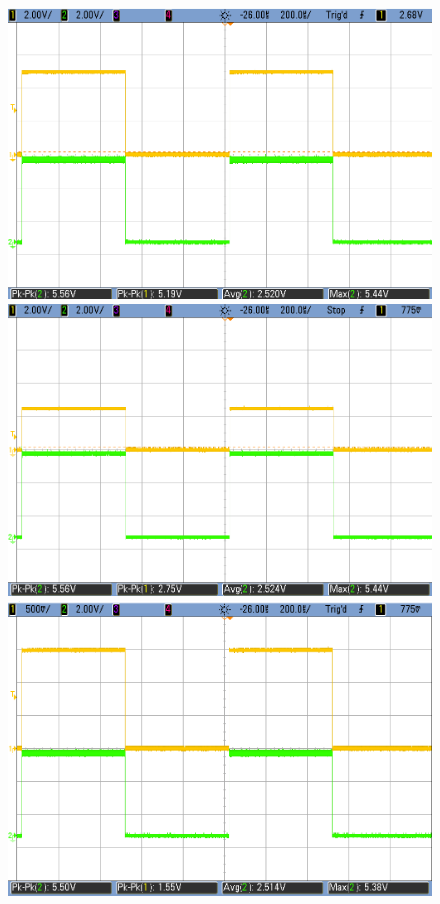     \begin{figure}[h!]
        \centering
        \includegraphics[scale=0.19]{../Exercise2/LS-HC-5V.png}\hspace{1cm}
        \includegraphics[scale=0.19]{../Exercise2/LS-HC-3V.png}\\
		\vspace{0.2cm}
        \includegraphics[scale=0.19]{../Exercise2/LS-HC-1p5V.png}\hspace{1cm}

\end{figure}
